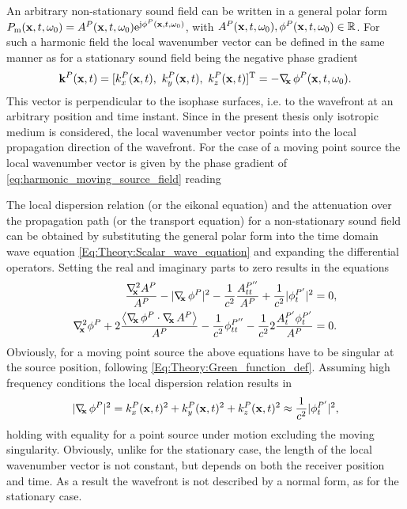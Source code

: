 An arbitrary non-stationary sound field can be written in a general polar form $P_{\mathrm{m}}(\mathbf{x},t,\omega_0) = A^P(\mathbf{x},t,\omega_0) \mathrm{e}^{\mathrm{j} \phi^P(\mathbf{x},t,\omega_0)}$, with $A^P(\mathbf{x},t,\omega_0),\phi^P(\mathbf{x},t,\omega_0) \in \mathbb{R}$.
For such a harmonic field the local wavenumber vector can be defined in the same manner as for a stationary sound field being the negative phase gradient
\begin{equation}
\label{eq:HF_appr:general_loc_wn}
\mathbf{k}^P(\mathbf{x},t) = [k_x^P(\mathbf{x},t),\ k_y^P(\mathbf{x},t),\ k_z^P(\mathbf{x},t)]^{\mathrm{T}} = -\nabla_{\!\!\mathbf{x}}\, \phi^P(\mathbf{x},t,\omega_0).
\end{equation}
This vector is perpendicular to the isophase surfaces, i.e. to the wavefront at an arbitrary position and time instant.
Since in the present thesis only isotropic medium is considered, the local wavenumber vector points into the local propagation direction of the wavefront.
For the case of a moving point source the local wavenumber vector is given by the phase gradient of \eqref{eq:harmonic_moving_source_field} reading

The local dispersion relation (or the eikonal equation) and the attenuation over the propagation path (or the transport equation) for a non-stationary sound field can be obtained by substituting the general polar form into the time domain wave equation \eqref{Eq:Theory:Scalar_wave_equation} and expanding the differential operators.
Setting the real and imaginary parts to zero results in the equations
\begin{eqnarray}
\frac{\Lx A^P}{A^P}  - | \Dx \phi^P |^2 -\frac{1}{c^2} \frac{A^{P''}_{tt}}{A^P} +\frac{1}{c^2}|\phi^{P'}_{t}|^2 = 0, \\ 
\label{eq:HF_appr:transport_eq_non_stat}
\Lx \phi^P + 2\frac{ \left< \Dx \phi^P \cdot \Dx A^P \right> }{A^P} - \frac{1}{c^2} \phi^{P''}_{tt} - \frac{1}{c^2} 2\frac{A^{P'}_t \phi^{P'}_t }{A^P} = 0.
\end{eqnarray}
Obviously, for a moving point source the above equations have to be singular at the source position, following \eqref{Eq:Theory:Green_function_def}.
Assuming high frequency conditions the local dispersion relation results in
\begin{equation} \label{eq:HF_appr:eikonal_eq_non_stat}
| \nabla_{\!\!\mathbf{x}}\, \phi^P |^2 = k_x^P(\mathbf{x},t)^2 + k_y^P(\mathbf{x},t)^2 + k_z^P(\mathbf{x},t)^2 \approx \frac{1}{c^2}|\phi^{P'}_{t}|^2,
\end{equation}
holding with equality for a point source under motion excluding the moving singularity.
Obviously, unlike for the stationary case, the length of the local wavenumber vector is not constant, but depends on both the receiver position and time.
As a result the wavefront is not described by a normal form, as for the stationary case.

